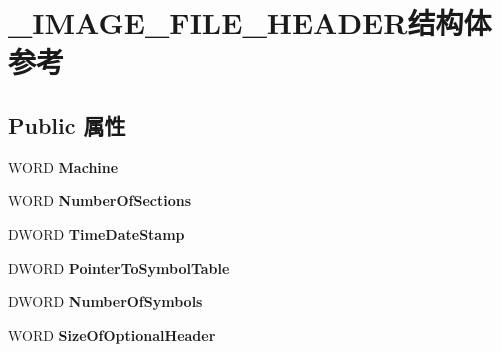 \hypertarget{struct___i_m_a_g_e___f_i_l_e___h_e_a_d_e_r}{}\section{\+\_\+\+I\+M\+A\+G\+E\+\_\+\+F\+I\+L\+E\+\_\+\+H\+E\+A\+D\+E\+R结构体 参考}
\label{struct___i_m_a_g_e___f_i_l_e___h_e_a_d_e_r}
\subsection*{Public 属性}
\begin{DoxyCompactItemize}
\item 
\mbox{\label{struct___i_m_a_g_e___f_i_l_e___h_e_a_d_e_r_aadde4ef78693fa8d4bc1c97c7d3c8c1a}} 
W\+O\+RD {\bfseries Machine}
\item 
\mbox{\label{struct___i_m_a_g_e___f_i_l_e___h_e_a_d_e_r_ad604cffb35b69981158822e14e9bc1c0}} 
W\+O\+RD {\bfseries Number\+Of\+Sections}
\item 
\mbox{\label{struct___i_m_a_g_e___f_i_l_e___h_e_a_d_e_r_af36d3522f4749a93453bde62c0f7732b}} 
D\+W\+O\+RD {\bfseries Time\+Date\+Stamp}
\item 
\mbox{\label{struct___i_m_a_g_e___f_i_l_e___h_e_a_d_e_r_a5c3f6aef5cd87caa9d5ce887aaf2e522}} 
D\+W\+O\+RD {\bfseries Pointer\+To\+Symbol\+Table}
\item 
\mbox{\label{struct___i_m_a_g_e___f_i_l_e___h_e_a_d_e_r_a3e054c70bc25a6797608fb32327348ad}} 
D\+W\+O\+RD {\bfseries Number\+Of\+Symbols}
\item 
\mbox{\label{struct___i_m_a_g_e___f_i_l_e___h_e_a_d_e_r_a7fc97339de25b2845ef855809be630ff}} 
W\+O\+RD {\bfseries Size\+Of\+Optional\+Header}
\item 
\mbox{\label{struct___i_m_a_g_e___f_i_l_e___h_e_a_d_e_r_a121e0ec6d4ce2ea021df48f6949956c3}} 

\end{DoxyCompactItemize}
